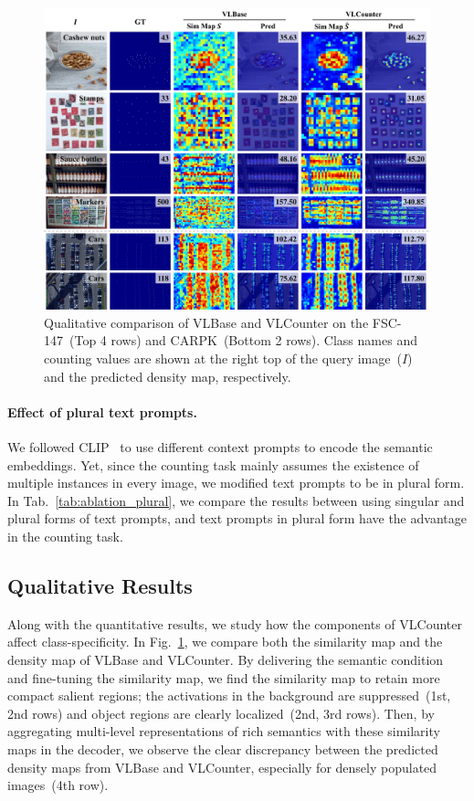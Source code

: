 \begin{figure}[t]
    \begin{center}
        \includegraphics[width=0.95\linewidth]{figs/qualitative.pdf}
    \end{center}
    \caption{
        Qualitative comparison of VLBase and VLCounter on the FSC-147~(Top 4 rows) and CARPK~(Bottom 2 rows).
        Class names and counting values are shown at the right top of the query image~($I$) and the predicted density map, respectively.
    }
    \label{fig:qualitative_results}
\end{figure}


\paragraph{Effect of plural text prompts.}
We followed CLIP~\cite{2021clip} to use different context prompts to encode the semantic embeddings.
Yet, since the counting task mainly assumes the existence of multiple instances in every image, we modified text prompts to be in plural form.
In Tab.~\ref{tab:ablation_plural}, we compare the results between using singular and plural forms of text prompts, and text prompts in plural form have the advantage in the counting task.




\subsection{Qualitative Results}
Along with the quantitative results, we study how the components of VLCounter affect class-specificity.
In Fig.~\ref{fig:qualitative_results}, we compare both the similarity map and the density map of VLBase and VLCounter.
By delivering the semantic condition and fine-tuning the similarity map, we find the similarity map to retain more compact salient regions; the activations in the background are suppressed~(1st, 2nd rows) and object regions are clearly localized~(2nd, 3rd rows).
Then, by aggregating multi-level representations of rich semantics with these similarity maps in the decoder, we observe the clear discrepancy between the predicted density maps from VLBase and VLCounter, especially for densely populated images~(4th row). 





